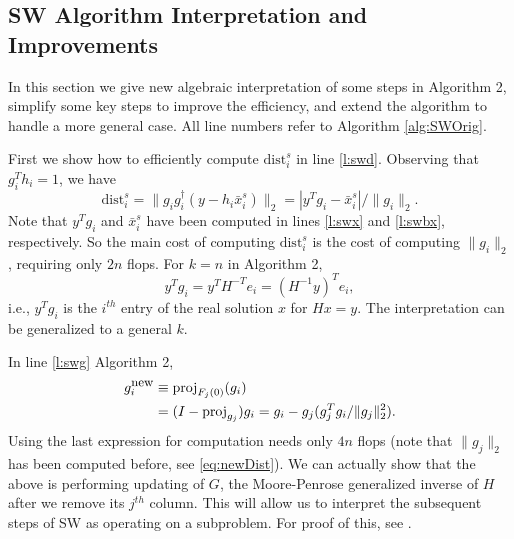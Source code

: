 \documentclass[12pt,Bold,letterpaper]{mcgilletdclass}
\newcommand{\dist}{\mathrm{dist}}
\newcommand{\vsp}{\vspace{\baselineskip}}
\begin{document}
\vsp \subsection{SW Algorithm Interpretation and Improvements}
\label{sec:improvedSW}
In this section we give new algebraic interpretation of some steps in Algorithm 2,
simplify some key steps to improve the efficiency,
and  extend the algorithm to handle a more general case.
All line numbers refer to Algorithm \ref{alg:SWOrig}.

First we show  how to efficiently compute $\dist_i^s$ in line \ref{l:swd}. 
Observing that $g_i^Th_i = 1$, we have
\begin{equation}
\label{eq:newDist}
\dist_i^s =   \|  g_ig_i^\dag (y-h_i\bar{x}_i^s)  \|_2 
=    | y^Tg_i -\bar{x}_i^s |/\| g_i  \|_2.
\end{equation} 
Note that $y^Tg_i$ and $\bar{x}_i^s$ have been computed in lines \ref{l:swx} and \ref{l:swbx}, respectively.
So the main cost of computing $\dist_i^s$ is the cost of computing $\|g_i\|_2$,
requiring only $2n$ flops. 
For $k=n$ in Algorithm 2,  $$y^Tg_i=y^TH^{-T}e_i=(H^{-1}y)^Te_i,$$ i.e.,  $y^Tg_i$
is the $i^{th}$ entry of the real solution $x$ for $Hx=y$. 
The interpretation can be generalized to  a general $k$. 

In line \ref{l:swg} Algorithm 2,  
\begin{align}
g_i^{\small \mbox{new}} & \equiv \mbox{proj}_{F_j(0)}(g_i)   \nonumber \\
  & =(I- \mbox{proj}_{g_j})g_i=g_i- g_j(g_j^Tg_i/\|g_j\|_2^2). \label{eq:gup}
\end{align}
Using the last expression for computation needs only $4n$ flops
(note that $\|g_j\|_2$ has been computed before, see \eqref{eq:newDist}).
We can actually show that the above is performing updating of $G$, the Moore-Penrose generalized inverse of
$H$ after we remove its $j^{th}$ column. This will allow us to interpret the subsequent steps of SW as operating on a subproblem. For proof of this, see \cite{Cli64}.
\end{document}
